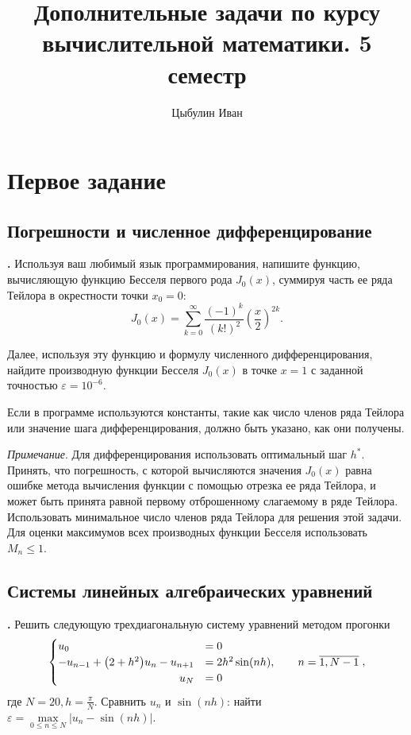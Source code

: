 \documentclass[12pt]{article}
\title{Дополнительные задачи по курсу вычислительной математики. 5 семестр}
\author{Цыбулин Иван}
\renewcommand{\leq}{\leqslant}
\newcounter{task}
\newcommand{\problem}{\par\textbf{\stepcounter{task}\thetask. }}
\begin{document}
\maketitle

\section{Первое задание}

\subsection{Погрешности и численное дифференцирование}

\problem Используя ваш любимый язык программирования, напишите функцию,
вычисляющую
функцию Бесселя первого рода $J_0(x)$, суммируя часть ее ряда Тейлора в
окрестности точки $x_0 = 0$:
\[
J_0(x) = \sum_{k = 0}^{\infty} \frac{(-1)^k}{(k!)^2}
\left(\frac{x}{2}\right)^{2k}.
\]

Далее, используя эту функцию и формулу численного дифференцирования,
найдите производную функции Бесселя $J_0(x)$ в точке $x = 1$ с заданной
точностью
$\varepsilon = 10^{-6}$.

Если в программе используются константы, такие как число членов ряда Тейлора или
значение шага дифференцирования, должно быть указано, как они получены.

\emph{Примечание}. Для дифференцирования использовать оптимальный шаг $h^*$.
Принять, что погрешность, с которой вычисляются значения $J_0(x)$ равна ошибке
метода вычисления функции с помощью отрезка ее ряда Тейлора, и может быть
принята равной первому отброшенному слагаемому в ряде Тейлора. Использовать
минимальное число членов ряда Тейлора для решения этой задачи. Для оценки
максимумов всех производных функции Бесселя использовать $M_n \leq 1$.

\subsection{Системы линейных алгебраических уравнений}

\problem Решить следующую трехдиагональную систему уравнений методом прогонки
\[
\begin{cases}
u_0 &= 0\\
-u_{n - 1} + \big(2 + h^2\big) u_n - u_{n+1} &= 2 h^2 \sin (nh), \qquad n =
\overline{1, N-1}\\
\hfill u_N &= 0\\
\end{cases},
\]
где $N = 20, h = \frac{\pi}{N}$. Сравнить $u_n$ и $\sin(nh)$: найти $\varepsilon = \max\limits_{0 \leq n \leq N} |u_n - \sin(nh)|$.
\end{document}
